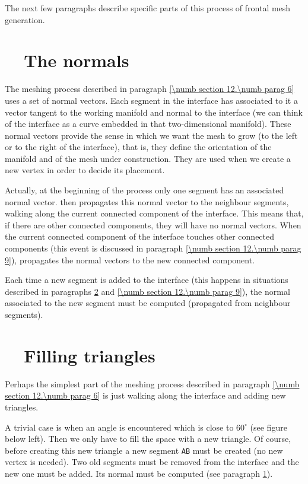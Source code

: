 The next few paragraphs describe specific parts of this process of frontal mesh generation.


\section{~~The normals}\label{\numb section 12.\numb parag 7}

The meshing process described in paragraph \ref{\numb section 12.\numb parag 6} uses a set of
normal vectors.
Each segment in the interface has associated to it
a vector tangent to the working manifold and normal to the interface (we can
think of the interface as a curve embedded in that two-dimensional manifold).
These normal vectors provide the sense in which we want the mesh to grow (to the left or to
the right of the interface), that is, they define the orientation of the manifold and of
the mesh under construction.
They are used when we create a new vertex in order to decide its placement.

Actually, at the beginning of the process only one segment has an associated normal vector.
{\ManiFEM} then propagates this normal vector to the neighbour segments, walking along
the current connected component of the interface.
This means that, if there are other connected components, they will have no normal vectors.
When the current connected component of the interface touches other connected components
(this event is discussed in paragraph \ref{\numb section 12.\numb parag 9}), {\maniFEM}
propagates the normal vectors to the new connected component.

Each time a new segment is added to the interface (this happens in situations described in
paragraphs \ref{\numb section 12.\numb parag 8} and \ref{\numb section 12.\numb parag 9}),
the normal associated to the new segment must be computed (propagated from neighbour
segments).


\section{~~Filling triangles}\label{\numb section 12.\numb parag 8}

Perhaps the simplest part of the meshing process described in paragraph
\ref{\numb section 12.\numb parag 6} is just walking along the interface and
adding new triangles.

A trivial case is when an angle is encountered which is close to $ 60^\circ $
(see figure below left).
Then we only have to fill the space with a new triangle.
Of course, before creating this new triangle a new segment {\small\tt AB} must be created
(no new vertex is needed).
Two old segments must be removed from the interface and the new one must be added.
Its normal must be computed (see paragraph \ref{\numb section 12.\numb parag 7}).

